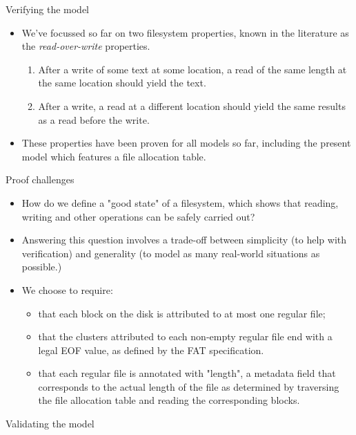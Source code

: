 \documentclass{beamer}
\begin{document}
\begin{frame}{Verifying the model}
  \begin{itemize}
  \item We've focussed so far on two filesystem properties, known in
    the literature as the \textit{read-over-write} properties.
    \begin{enumerate}
    \item After a write of some text at some location, a read of the
      same length at the same location should yield the text.
    \item After a write, a read at a different location should yield
      the same results as a read before the write.
    \end{enumerate}
  \item These properties have been proven for all models so far,
    including the present model which features a file allocation
    table.
  \end{itemize}
\end{frame}

\begin{frame}{Proof challenges}
  \begin{itemize}
  \item How do we define a "good state" of a filesystem, which shows
    that reading, writing and other operations can be safely carried
    out?
  \item Answering this question involves a trade-off between
    simplicity (to help with verification) and generality (to model as
    many real-world situations as possible.)
  \item We choose to require:
    \begin{itemize}
    \item that each block on the disk is attributed to at most one
      regular file;
    \item that the clusters attributed to each non-empty regular file
      end with a legal EOF value, as defined by the FAT specification.
    \item that each regular file is annotated with "length", a
      metadata field that corresponds to the actual length of the file
      as determined by traversing the file allocation table and
      reading the corresponding blocks.
    \end{itemize}
  \end{itemize}
\end{frame}

\begin{frame}{Validating the model}
\end{frame}
\end{document}
